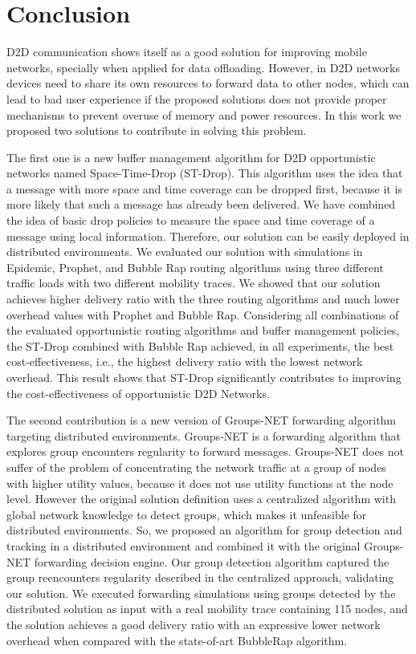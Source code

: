 \chapter{Conclusion}
\label{ch:Conclusion}

D2D communication shows itself as a good solution for improving mobile networks, specially when applied for data offloading. However, in D2D networks devices need to share its own resources to forward data to other nodes, which can lead to bad user experience if the proposed solutions does not provide proper mechanisms to prevent overuse of memory and power resources. In this work we proposed two solutions to contribute in solving this problem.

The first one is a new buffer management algorithm for D2D opportunistic networks named Space-Time-Drop (ST-Drop). This algorithm uses the idea that a message with more space and time coverage can be dropped first, because it is more likely that such a message has already been delivered. We have combined the idea of basic drop policies to measure the space and time coverage of a message using local information. Therefore, our solution can be easily deployed in distributed environments. We evaluated our solution with simulations in Epidemic, Prophet, and Bubble Rap routing algorithms using three different traffic loads with two different mobility traces. We showed that our solution achieves higher delivery ratio with the three routing algorithms and much lower overhead values with Prophet and Bubble Rap. Considering all combinations of the evaluated opportunistic routing algorithms and buffer management policies, the ST-Drop combined with Bubble Rap achieved, in all experiments, the best cost-effectiveness, i.e., the highest delivery ratio with the lowest network overhead. This result shows that ST-Drop significantly contributes to improving the cost-effectiveness of opportunistic D2D Networks.

The second contribution is a new version of Groups-NET forwarding algorithm targeting distributed environments. Groups-NET is a forwarding algorithm that explores group encounters regularity to forward messages. Groups-NET does not suffer of the problem of concentrating the network traffic at a group of nodes with higher utility values, because it does not use utility functions at the node level. However the original solution definition uses a centralized algorithm with global network knowledge to detect groups, which makes it unfeasible for distributed environments. So, we proposed an algorithm for group detection and tracking in a distributed environment and combined it with the original Groups-NET forwarding decision engine. Our group detection algorithm captured the group reencounters regularity described in the centralized approach, validating our solution. We executed forwarding simulations using groups detected by the distributed solution as input with a real mobility trace containing 115 nodes, and the solution achieves a good delivery ratio with an expressive lower network overhead when compared with the state-of-art BubbleRap algorithm.

